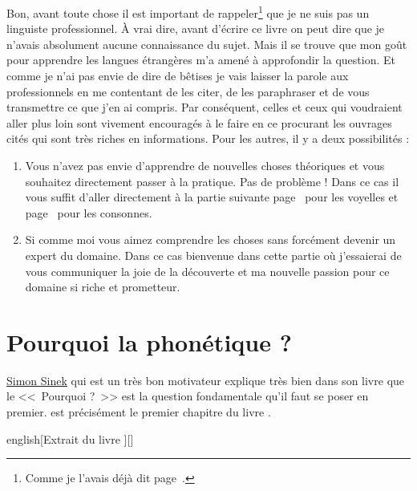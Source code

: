 Bon, avant toute chose il est important de rappeler\footnote{Comme je
  l'avais déjà dit page~\pageref{sec:phonetics}.} que je ne suis pas
un linguiste professionnel. À vrai dire, avant d'écrire ce livre on
peut dire que je n'avais absolument aucune connaissance du sujet. Mais
il se trouve que mon goût pour apprendre les langues étrangères m'a
amené à approfondir la question. Et comme je n'ai pas envie de dire de
bêtises je vais laisser la parole aux professionnels en me contentant
de les citer, de les paraphraser et de vous transmettre ce que j'en ai
compris. Par conséquent, celles et ceux qui voudraient aller plus loin
sont vivement encouragés à le faire en ce procurant les ouvrages cités
qui sont très riches en informations. Pour les autres, il y a deux
possibilités :
\begin{enumerate}
\item Vous n'avez pas envie d'apprendre de nouvelles choses théoriques
  et vous souhaitez directement passer à la pratique. Pas de problème
  ! Dans ce cas il vous suffit d'aller directement à la partie
  suivante page~\pageref{part:vow} pour les voyelles et
  page~\pageref{part:conson} pour les consonnes.
\item Si comme moi vous aimez comprendre les choses sans forcément
  devenir un expert du domaine. Dans ce cas bienvenue dans cette
  partie où j'essaierai de vous communiquer la joie de la découverte
  et ma nouvelle passion pour ce domaine si riche et prometteur.  
\end{enumerate}

\chapter{Pourquoi la phonétique ?}\label{chap:phonetic}

\href{https://fr.wikipedia.org/wiki/Simon_Sinek}{Simon Sinek} qui est
un très bon motivateur explique très bien dans son livre
\href{https://amzn.to/2qY8uMD}{} que 
le <<~Pourquoi ?~>> est la question fondamentale qu'il faut se poser
en premier.  est précisément le premier chapitre
du livre \lodge.

\begin{foreigndisplayquote}{english}[Extrait du livre \lodge][]
\end{foreigndisplayquote}

